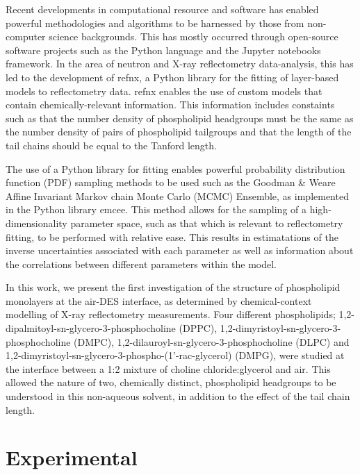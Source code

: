 \documentclass[twoside,twocolumn,9pt]{article}
\begin{document}
Recent developments in computational resource and software has enabled powerful methodologies and algorithms to be harnessed by those from non-computer science backgrounds. This has mostly occurred through open-source software projects such as the Python language and the Jupyter notebooks framework.\cite{vanRossum1995,Kluyver2016} In the area of neutron and X-ray reflectometry data-analysis, this has led to the development of refnx,\cite{Nelson2018} a Python library for the fitting of layer-based models to reflectometry data. refnx enables the use of custom models that contain chemically-relevant information. This information includes constaints such as that the number density of phospholipid headgroups must be the same as the number density of pairs of phospholipid tailgroups and that the length of the tail chains should be equal to the Tanford length.\cite{Tanford1980}

The use of a Python library for fitting enables powerful probability distribution function (PDF) sampling methods to be used such as the Goodman \& Weare Affine Invariant Markov chain Monte Carlo (MCMC) Ensemble,\cite{Goodman2010} as implemented in the Python library emcee.\cite{Foreman-Mackey2013} This method allows for the sampling of a high-dimensionality parameter space, such as that which is relevant to reflectometry fitting, to be performed with relative ease. This results in estimatations of the inverse uncertainties associated with each parameter as well as information about the correlations between different parameters within the model. 

In this work, we present the first investigation of the structure of phospholipid monolayers at the air-DES interface, as determined by chemical-context modelling of X-ray reflectometry measurements. Four different phospholipids; 1,2-dipalmitoyl-sn-glycero-3-phosphocholine (DPPC), 1,2-dimyristoyl-sn-glycero-3-phosphocholine (DMPC),  1,2-dilauroyl-sn-glycero-3-phosphocholine (DLPC) and 1,2-dimyristoyl-sn-glycero-3-phospho-(1'-rac-glycerol) (DMPG), were studied at the interface between a 1:2 mixture of choline chloride:glycerol and air. This allowed the nature of two, chemically distinct, phospholipid headgroups to be understood in this non-aqueous solvent, in addition to the effect of the tail chain length. 

\section{Experimental}
\end{document}
